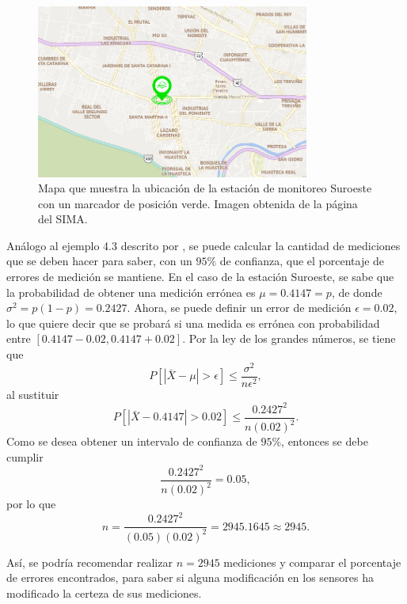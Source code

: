 \documentclass[paper=leter, fontsize=11pt]{scrartcl}
\begin{document}
\begin{figure}
  \centering
  \includegraphics[width=0.8\textwidth]{so.png}
\caption{Mapa que muestra la ubicación de la estación de monitoreo Suroeste con un marcador de posición verde. Imagen obtenida de la página del SIMA\cite{aireNL}.}
\label{fig:so_geo}
\end{figure}

Análogo al ejemplo 4.3 descrito por \citet{Sedor2015}, se puede calcular la cantidad de mediciones que se deben hacer para saber, con un $95\%$ de confianza, que el porcentaje de errores de medición se mantiene. En el caso de la estación Suroeste, se sabe que la probabilidad de obtener una medición errónea es $\mu = 0.4147 = p$, de donde $\sigma^2 = p(1 - p) = 0.2427$. Ahora, se puede definir un error de medición $\epsilon = 0.02$, lo que quiere decir que se probará si una medida es errónea con probabilidad entre $[0.4147 - 0.02, 0.4147 + 0.02]$. Por la ley de los grandes números, se tiene que
$$P[|\bar{X} - \mu| > \epsilon] \leq \frac{\sigma^2}{n \epsilon^2},$$ 
al sustituir
$$P[|\bar{X} - 0.4147| > 0.02] \leq \frac{0.2427^2}{n (0.02)^2}.$$
Como se desea obtener un intervalo de confianza de $95\%$, entonces se debe cumplir
$$\frac{0.2427^2}{n (0.02)^2} = 0.05,$$
por lo que
$$n = \frac{0.2427^2}{(0.05) (0.02)^2} = 2945.1645 \approx 2945.$$

Así, se podría recomendar realizar $n = 2945$ mediciones y comparar el porcentaje de errores encontrados, para saber si alguna modificación en los sensores ha modificado la certeza de sus mediciones.
 


\end{document}
